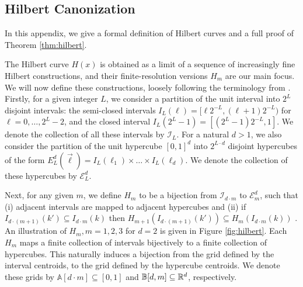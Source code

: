 \subsection{Hilbert Canonization}\label{app:hilbert}
In this appendix, we give a formal definition of Hilbert curves and a full proof of Theorem \ref {thm:hilbert}.

The Hilbert curve $H(x)$ is obtained as a limit of a sequence of increasingly fine Hilbert constructions, and their finite-resolution versions $H_m$ are our main focus. We will now define these constructions, loosely following the terminology from \cite{Hilbert}. Firstly, for a given integer $L$, we consider a partition of the unit interval into $2^L$ disjoint intervals: the semi-closed intervals $I_L(\ell)=[\ell 2^{-L},(\ell+1)2^{-L})$ for $\ell=0,\ldots,2^{L}-2$, and the closed interval $I_L(2^L-1)=[(2^L-1)2^{-L},1]$. We denote the collection of all these intervals by $\mathcal{I}_L$. For a natural $d>1$, we also consider the partition of the unit hypercube $[0,1]^d$ into $2^{L\cdot d}$ disjoint hypercubes of the form
$E_L^d(\vec{\ell})=I_L(\ell_1)\times \ldots \times I_L(\ell_d)$. We denote the collection of these hypercubes by $\mathcal{E}_L^d$.

Next, for any given $m$, we define  $H_m$ to be a  bijection from $\mathcal{I}_{d\cdot m} $ to $\mathcal{E}_{m}^d $, such that (i) adjacent intervals are mapped to adjacent hypercubes and (ii) if $I_{d\cdot (m+1)}(k')\subseteq I_{d\cdot m}(k) $ then
$H_{m+1}\left(I_{d\cdot (m+1)}(k')\right)\subseteq H_m\left(I_{d\cdot m}(k) \right) $ . An illustration of $H_m, m=1,2,3$ for $d=2$ is given in Figure \ref{fig:hilbert}. Each $H_m$ maps a finite collection of intervals bijectively to a finite collection of hypercubes. This naturally induces a bijection from the grid defined by the interval centroids, to the grid defined by the hypercube centroids. We denote these grids by $\mathbb{A}[d\cdot m]\subseteq [0,1] $ and $\mathbb{B}[d,m]\subseteq \mathbb{R}^d $, respectively.

